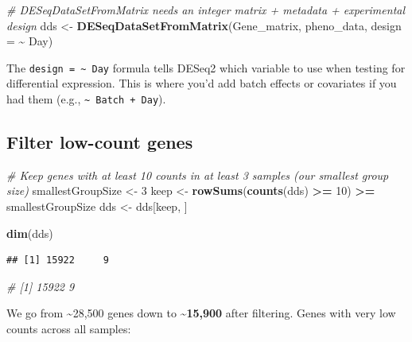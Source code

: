 \documentclass[
]{article}
\newenvironment{Shaded}{\begin{snugshade}}{\end{snugshade}}
\newcommand{\AttributeTok}[1]{\textcolor[rgb]{0.13,0.29,0.53}{#1}}
\newcommand{\CommentTok}[1]{\textcolor[rgb]{0.56,0.35,0.01}{\textit{#1}}}
\newcommand{\DecValTok}[1]{\textcolor[rgb]{0.00,0.00,0.81}{#1}}
\newcommand{\FunctionTok}[1]{\textcolor[rgb]{0.13,0.29,0.53}{\textbf{#1}}}
\newcommand{\NormalTok}[1]{#1}
\newcommand{\OtherTok}[1]{\textcolor[rgb]{0.56,0.35,0.01}{#1}}
\newcommand{\SpecialCharTok}[1]{\textcolor[rgb]{0.81,0.36,0.00}{\textbf{#1}}}
\begin{document}
\begin{Shaded}
\begin{Highlighting}[]
\CommentTok{\# DESeqDataSetFromMatrix needs an integer matrix + metadata + experimental design}
\NormalTok{dds }\OtherTok{\textless{}{-}} \FunctionTok{DESeqDataSetFromMatrix}\NormalTok{(Gene\_matrix, pheno\_data, }\AttributeTok{design =} \SpecialCharTok{\textasciitilde{}}\NormalTok{ Day)}
\end{Highlighting}
\end{Shaded}

The \texttt{design\ =\ \textasciitilde{}\ Day} formula tells DESeq2
which variable to use when testing for differential expression. This is
where you'd add batch effects or covariates if you had them (e.g.,
\texttt{\textasciitilde{}\ Batch\ +\ Day}).

\subsection{Filter low-count genes}\label{filter-low-count-genes}

\begin{Shaded}
\begin{Highlighting}[]
\CommentTok{\# Keep genes with at least 10 counts in at least 3 samples (our smallest group size)}
\NormalTok{smallestGroupSize }\OtherTok{\textless{}{-}} \DecValTok{3}
\NormalTok{keep }\OtherTok{\textless{}{-}} \FunctionTok{rowSums}\NormalTok{(}\FunctionTok{counts}\NormalTok{(dds) }\SpecialCharTok{\textgreater{}=} \DecValTok{10}\NormalTok{) }\SpecialCharTok{\textgreater{}=}\NormalTok{ smallestGroupSize}
\NormalTok{dds  }\OtherTok{\textless{}{-}}\NormalTok{ dds[keep, ]}

\FunctionTok{dim}\NormalTok{(dds)}
\end{Highlighting}
\end{Shaded}

\begin{verbatim}
## [1] 15922     9
\end{verbatim}

\begin{Shaded}
\begin{Highlighting}[]
\CommentTok{\# [1] 15922     9}
\end{Highlighting}
\end{Shaded}

We go from \textasciitilde28,500 genes down to
\textbf{\textasciitilde15,900} after filtering. Genes with very low
counts across all samples:
\end{document}
